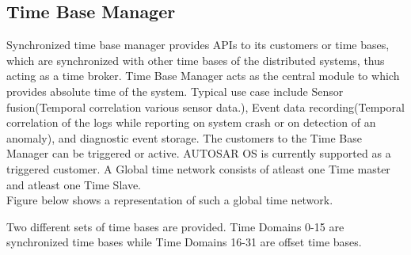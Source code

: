 \subsection{Time Base Manager}
Synchronized time base manager provides APIs to its customers or time bases, which are synchronized with other time bases of the distributed systems, thus acting as a time broker.
Time Base Manager acts as the central module to which provides absolute time of the system. Typical use case include Sensor fusion(Temporal correlation various sensor data.), Event data recording(Temporal correlation of the logs while reporting on system crash or on detection of an anomaly), and diagnostic event storage.
The customers to the Time Base Manager can be triggered or active. AUTOSAR OS is currently supported as a triggered customer.
A Global time network consists of atleast one Time master and atleast one Time Slave. \\
Figure below shows a representation of such a global time network.

\noindent%
\begin{minipage}{\linewidth}%
\end{minipage}

Two different sets of time bases are provided. Time Domains 0-15 are synchronized time bases while Time Domains 16-31 are offset time bases.

